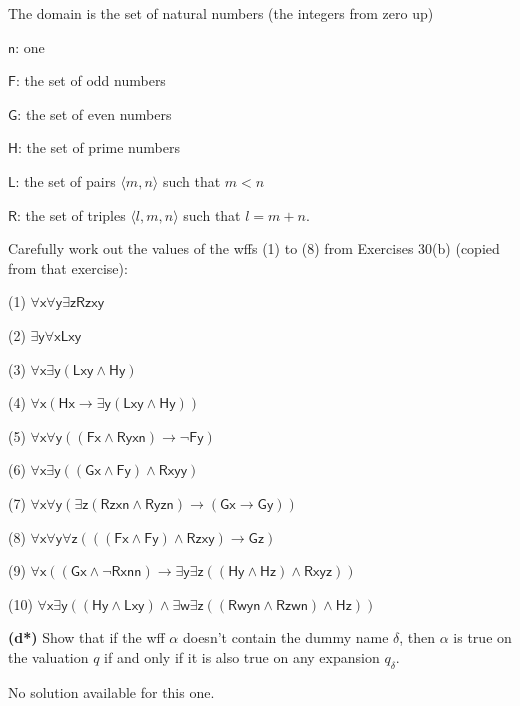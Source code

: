 \documentclass[14pt]{extarticle}
\begin{document}
The domain is the set of natural numbers (the integers from zero up)

$\mathsf{n}$: one

$\mathsf{F}$: the set of odd numbers

$\mathsf{G}$: the set of even numbers

$\mathsf{H}$: the set of prime numbers

$\mathsf{L}$: the set of pairs $\langle m, n\rangle$ such that $m < n$

$\mathsf{R}$: the set of triples $\langle l, m, n\rangle$ such that $l = m + n$.

Carefully work out the values of the wffs (1) to (8) from Exercises 30(b) (copied from that exercise):

(1) $\mathsf{\forall x \forall y \exists z Rzxy}$

(2) $\mathsf{\exists y \forall x Lxy}$

(3) $\mathsf{\forall x \exists y (Lxy \wedge Hy)}$

(4) $\mathsf{\forall x(Hx \to \exists y (Lxy \wedge Hy))}$

(5) $\mathsf{\forall x \forall y ((Fx \wedge Ryxn) \to \neg Fy)}$

(6) $\mathsf{\forall x \exists y ((Gx \wedge Fy) \wedge Rxyy)}$

(7) $\mathsf{\forall x \forall y (\exists z(Rzxn \wedge Ryzn) \to (Gx \to Gy))}$

(8) $\mathsf{\forall x \forall y \forall z (((Fx \wedge Fy) \wedge Rzxy) \to Gz)}$

(9) $\mathsf{\forall x ((Gx \wedge \neg Rxnn) \to \exists y \exists z((Hy \wedge Hz) \wedge Rxyz))}$

(10) $\mathsf{\forall x \exists y ((Hy \wedge Lxy) \wedge \exists w \exists z((Rwyn \wedge Rzwn) \wedge Hz))}$

{\bf(d*)} Show that if the wff $\alpha$ doesn’t contain the dummy name $\delta$, then $\alpha$ is true on the valuation $q$ if and only if it is also true on any expansion $q_\delta$.

No solution available for this one.
\end{document}
